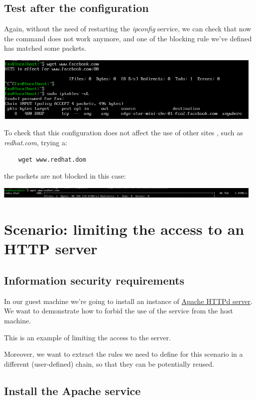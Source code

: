 \documentclass{article}
\begin{document}
\subsection{Test after the configuration}

Again, without the need of restarting the \emph{ipconfig} service,
we can check that now the command does not work anymore,
and one of the blocking rule we've defined has matched some packets.

\includegraphics[width=13cm]{h8-6}

To check that this configuration does not affect the use of other
sites , such as \emph{redhat.com}, trying a:

\begin{verbatim}
	wget www.redhat.dom
\end{verbatim}

\noindent the packets are not blocked in this case:

\includegraphics[width=13cm]{h8-7}

\section{Scenario: limiting the access to an HTTP server}

\subsection{Information security requirements}

In our guest machine we're going to install an instance of 
\href{https://httpd.apache.org/}{Apache HTTPd server}.
We want to demonstrate how to forbid the use of the service from
the host machine.

This is an example of limiting the access to the server.

Moreover, we want to extract the rules we need to define for this scenario 
in a different (user-defined) chain, so that they can be potentially reused.

 \subsection{Install the Apache service}
 
\end{document}
